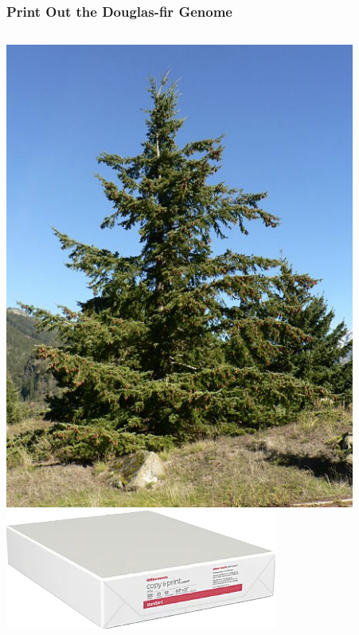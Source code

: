\documentclass{beamer}
\begin{document}
\begin{frame}
\begin{columns}
\begin{column}{0.6\textwidth}
		\end{column}
	\end{columns}
\end{frame}


\begin{frame}
	\frametitle{Print Out the Douglas-fir Genome}
	\begin{columns}
		\begin{column}{0.4\textwidth}
			\centering	\includegraphics[keepaspectratio, width  =0.9\textwidth]{img/doug-fir}\\
			\vspace{5pt}
			\centering	\includegraphics[keepaspectratio, width  =0.7\textwidth]{img/reamOpaper}\\
		\end{column}
		\begin{column}{0.6\textwidth}
			

\end{column}
\end{columns}
\end{frame}
\end{document}
